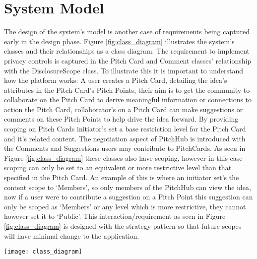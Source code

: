\section{System Model}\label{S:systemModel}

The design of the system's model is another case of requirements being captured early in the design phase. Figure \ref{fig:class_diagram} illustrates the system's classes and their relationships as a class diagram. The requirement to implement privacy controls is captured in the Pitch Card and Comment classes' relationship with the DisclosureScope class. To illustrate this it is important to understand how the platform works: A user creates a Pitch Card, detailing the idea's attributes in the Pitch Card's Pitch Points, their aim is to get the community to collaborate on the Pitch Card to derive meaningful information or connections to action the Pitch Card, collaborator's on a Pitch Card can make suggestions or comments on these Pitch Points to help drive the idea forward. By providing scoping on Pitch Cards initiator's set a base restriction level for the Pitch Card and it's related content. The negotiation aspect of PitchHub is introduced with the Comments and Suggestions users may contribute to PitchCards. As seen in Figure \ref{fig:class_diagram} these classes also have scoping, however in this case scoping can only be set to an equivalent or more restrictive level than that specified in the Pitch Card. An example of this is where an initiator set's the content scope to `Members', so only members of the PitchHub can view the idea, now if a user were to contribute a suggestion on a Pitch Point this suggestion can only be scoped as `Members' or any level which is more restrictive, they cannot however set it to `Public'. This interaction/requirement as seen in Figure \ref{fig:class_diagram} is designed with the strategy pattern so that future scopes will have minimal change to the application.
 
\begin{sidewaysfigure}[ht]
    \centering
    \texttt{[image: class\_diagram]}
    \caption{PitchHub's system structure as represented in a class diagram. Of note is the Pitch Card and Comment classes and their relationship to the DisclosureScopes. This relationship describes the Pitch Card and Comment classes ability to scope the visibility of their content. (NB: Some attributes were left out for the sake of brevity e.g. Pitch Cards have an `images' attribute)}
    \label{fig:class_diagram}
\end{sidewaysfigure}

